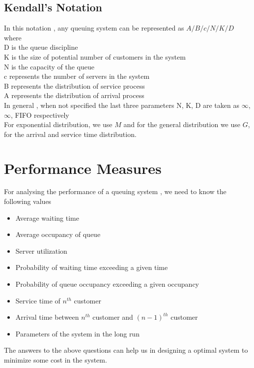 \subsection{Kendall's Notation}
In this notation , any queuing system can be represented as $A/B/c/N/K/D$ where 
\\ D is the queue discipline
\\ K is the size of potential number of customers in the system
\\ N is the capacity of the queue
\\ c represents the number of servers in the system 
\\ B represents the distribution of service process
\\ A represents the distribution of arrival process
\\ In general , when not specified the last three parameters N, K, D are taken as $\infty$, $\infty$, FIFO respectively
\\ For exponential distribution, we use $M$ and for the general distribution we use $G$, for the arrival and service time distribution.
\section{Performance Measures}
For analysing the performance of a queuing system , we need to know the following values
\begin{itemize}
    \item Average waiting time
    \item Average occupancy of queue
    \item Server utilization
    \item Probability of waiting time exceeding a given time
    \item Probability of queue occupancy exceeding a given occupancy
    \item Service time of $n^{th}$ customer
    \item Arrival time between $n^{th}$ customer and $(n-1)^{th}$ customer
    \item Parameters of the system in the long run
\end{itemize}
The answers to the above questions can help us in designing a optimal system to minimize some cost in the system.
